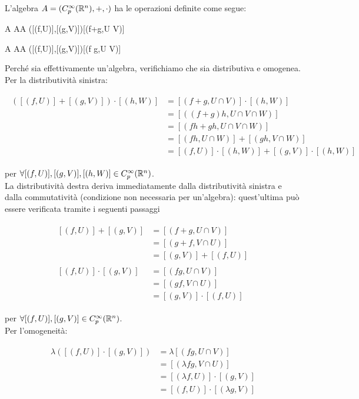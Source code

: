 L'algebra $ A = (C_{p}^{\infty}(\mathbb{R}^{n}),+,\cdot) $ ha le operazioni definite come segue:

\map{+}
	{A \times A}{A}
	{([(f,U)],[(g,V)])}{[(f+g,U \cap V)]}
	
\map{\cdot}
	{A \times A}{A}
	{([(f,U)],[(g,V)])}{[(f g,U \cap V)]}

Perché sia effettivamente un'algebra, verifichiamo che sia distributiva e omogenea.\\
Per la distributività sinistra:

\begin{align}
	\begin{split}
		([(f,U)] + [(g,V)]) \cdot [(h,W)] &= [(f+g,U \cap V)] \cdot [(h,W)]\\
		&= [((f+g) h,U \cap V \cap W)]\\
		&= [(fh + gh,U \cap V \cap W)]\\
		&= [(fh,U \cap W)] + [(gh,V \cap W)]\\
		&= [(f,U)] \cdot [(h,W)] + [(g,V)] \cdot [(h,W)]
	\end{split}
\end{align}

per $ \forall [(f,U)], [(g,V)], [(h,W)] \in C_{p}^{\infty}(\mathbb{R}^{n}) $.\\
La distributività destra deriva immediatamente dalla distributività sinistra e dalla commutatività (condizione non necessaria per un'algebra): quest'ultima può essere verificata tramite i seguenti passaggi

\begin{align}
	\begin{split}
		[(f,U)] + [(g,V)] &= [(f+g,U \cap V)]\\
		&= [(g+f,V \cap U)]\\
		&= [(g,V)] + [(f,U)]\\\\
		[(f,U)] \cdot [(g,V)] &= [(fg,U \cap V)]\\
		&= [(gf,V \cap U)]\\
		&= [(g,V)] \cdot [(f,U)]
	\end{split}
\end{align}

per $ \forall [(f,U)], [(g,V)] \in C_{p}^{\infty}(\mathbb{R}^{n}) $.\\
Per l'omogeneità:

\begin{align}
	\begin{split}
		\lambda ([(f,U)] \cdot [(g,V)]) &= \lambda [(fg,U \cap V)]\\
		&= [(\lambda fg,V \cap U)]\\
		&= [(\lambda f,U)] \cdot [(g,V)]\\
		&= [(f,U)] \cdot [(\lambda g,V)]
	\end{split}
\end{align}


